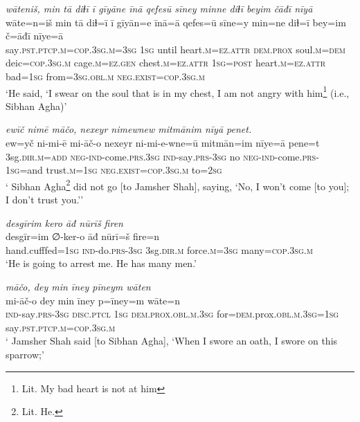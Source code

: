 \ea \label{DP.38}
\textit{wāteniš, min tā diɫī ī gīyāne īnā qefesū sīney minne diɫī beyim čāđī nīyā} \\ 
\gll wāte=n=iš min tā diɫ=ī ī gīyān=e īnā=ā qefes=ū sīne=y min=ne diɫ=ī bey=im č=āđī nīye=ā \\ 
 say\textsc{.pst}\textsc{.ptcp}\textsc{.m}\textsc{=cop}\textsc{.3sg}\textsc{.m}\textsc{=3sg} \textsc{1sg} until heart\textsc{.m}\textsc{=ez}.\textsc{attr} \textsc{dem.prox} soul\textsc{.m}\textsc{=dem} deic\textsc{=cop}\textsc{.3sg}\textsc{.m} cage\textsc{.m}\textsc{=ez}\textsc{.gen} chest\textsc{.m}\textsc{=ez}.\textsc{attr} \textsc{1sg}\textsc{=\textsc{post}} heart\textsc{.m}\textsc{=ez}.\textsc{attr} bad\textsc{=1sg} from\textsc{=3sg}\textsc{.obl}\textsc{.m} \textsc{\textsc{neg.}exist}\textsc{=cop}\textsc{.3sg}\textsc{.m} \\ 
\glt `He said, ‘I swear on the soul that is in my chest, I am not angry with him\footnote{Lit. My bad heart is not at him} (i.e., Sibhan Agha)'
\z 
 
\ea \label{DP.40}
\textit{ewīč nimē māčo, nexeyr nimewnew mitmānim nīyā penet.} \\ 
\gll ew=yč ni-mi-ē mi-āč-o nexeyr ni-mi-e-wne=ū mitmān=im nīye=ā pene=t \\ 
 3sg\textsc{.dir}\textsc{.m}\textsc{=add} \textsc{neg-}\textsc{ind-}come\textsc{.prs}\textsc{.3sg} \textsc{ind-}say\textsc{.prs}\textsc{-3sg} no \textsc{neg-}\textsc{ind-}come\textsc{.prs}\textsc{-1sg}=and trust\textsc{.m}\textsc{=1sg} \textsc{\textsc{neg.}exist}\textsc{=cop}\textsc{.3sg}\textsc{.m} to\textsc{=\textsc{2sg}} \\ 
\glt ` Sibhan Agha\footnote{Lit. He.} did not go [to Jamsher Shah], saying, ‘No, I won’t come [to you]; I don’t trust you.’'
\z 
 
\ea \label{DP.41}
\textit{desgīrim kero āđ nūrīš firen} \\ 
\gll desgīr=im ∅-ker-o āđ nūrī=š fire=n \\ 
 hand.cufffed\textsc{=1sg} \textsc{ind-}do\textsc{.prs}\textsc{-3sg} 3sg\textsc{.dir}\textsc{.m} force\textsc{.m}\textsc{=3sg} many\textsc{=cop}\textsc{.3sg}\textsc{.m} \\ 
\glt `He is going to arrest me. He has many men.'
\z 
 
\ea \label{DP.48}
\textit{māčo, dey min īney pīneym wāten} \\ 
\gll mi-āč-o dey min īney p=īney=m wāte=n \\ 
 \textsc{ind-}say\textsc{.prs}\textsc{-3sg} \textsc{disc.ptcl} \textsc{1sg} \textsc{dem.prox}\textsc{.obl}\textsc{.m}\textsc{.3sg} for\textsc{=dem}.prox\textsc{.obl}\textsc{.m}\textsc{.3sg}\textsc{=1sg} say\textsc{.pst}\textsc{.ptcp}\textsc{.m}\textsc{=cop}\textsc{.3sg}\textsc{.m} \\ 
\glt ` Jamsher Shah said [to Sibhan Agha], ‘When I swore an oath, I swore on this sparrow;'
\z 
 

